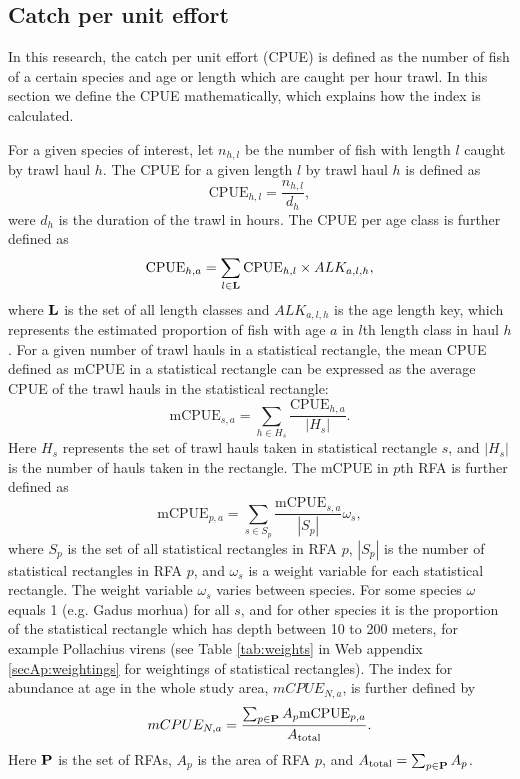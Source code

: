 \documentclass[a4paper 12pt]{article}
\numberwithin{equation}{section}
\begin{document}
\subsection{Catch per unit effort}
\label{sec:cpueestimators}
In this research, the catch per unit effort (CPUE) is defined as the number of fish of a certain species and age or length which are caught per hour trawl. In this section we define the CPUE mathematically, which explains how the index is calculated. 

For a given species of interest, let $n_{h,l}$ be the number of fish with length $l$ caught by trawl haul $h$. The CPUE for a given length $l$ by trawl haul $h$ is defined as 
\begin{equation}\label{eq:cpueHaul}
\mathrm{CPUE}_{h,l} =\frac{n_{h,l}}{d_h},
\end{equation}
were $d_h$ is the duration of the trawl in hours. The CPUE per age class is further defined as
\begin{equation}\label{eq:cpueALK}
\mathrm{CPUE}_{h,a} =\sum_{l \in {\bf L}}\mathrm{CPUE}_{h, l} \times ALK_{a,l,h},
\end{equation}
where ${\bf L}$ is the set of all length classes and $ALK_{a,l,h}$ is the age length key, which represents the estimated proportion of fish with age $a$ in $l$th length class in haul $h$. For a given number of trawl hauls in a statistical rectangle, the mean CPUE defined as  mCPUE  in a statistical rectangle can be expressed as the average CPUE of the trawl hauls in the statistical rectangle:
\begin{equation}\label{eq:cpueRec}
\mathrm{mCPUE}_{s,a} =\sum_{h \in H_{s}}\frac{\mathrm{CPUE}_{h,a}}{|H_{s}|}.
\end{equation}
Here $H_{s}$ represents the set of trawl hauls taken in statistical rectangle $s$, and $|H_{s}|$ is the number of hauls taken in the rectangle. The mCPUE in $p$th RFA is further defined as
\begin{equation}\label{eq:cpueRFA}
\mathrm{mCPUE}_{p,a} = \sum_{s \in S_{p}} \frac{\mathrm{mCPUE}_{s,a}}{|S_{p}|} \omega_s,
\end{equation}
where $S_{p}$ is the set of all statistical rectangles in RFA $p$, $|S_{p}|$ is the number of statistical rectangles in RFA $p$, and $\omega_s$ is a weight variable for each statistical rectangle. The weight variable $\omega_s$ varies between species. For some species $\omega$ equals 1 (e.g. Gadus morhua) for all $s$, and for other species it is the proportion of the statistical rectangle which has depth between 10 to 200 meters, for example Pollachius virens (see Table \ref{tab:weights} in Web appendix \ref{secAp:weightings}  for weightings of statistical rectangles).  The index for abundance at age in the whole study area, $mCPUE_{N,a} $, is further defined by
\begin{equation}
mCPUE_{N,a} = \frac{\sum_{p\in {\bf P}} A_{p}  \mathrm{mCPUE}_{p,a}}{A_{\text{total}}}.
\label{abundanceestimatornorthsea}
\end{equation}
Here ${\bf P}$ is the set of RFAs, $A_p$ is the area of RFA $p$, and $A_{\text{total}} = \sum_{p\in {\bf P}} A_{p}$.
\end{document}
